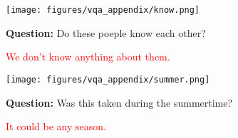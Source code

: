 \begin{figure}[h]
\centering

\begin{tcolorbox}[colback=gray!4, colframe=gray!50, arc=2mm, boxrule=0.5pt,left=9pt,right=9pt]
\small
    
\begin{minipage}{0.48\textwidth}
\begin{tcolorbox}[colback=white, colframe=gray!50, arc=2mm, boxrule=0.5pt]
\begin{minipage}{0.46\textwidth}
\texttt{[image: figures/vqa\_appendix/know.png]}
\end{minipage}
\hfill
\begin{minipage}{0.5\textwidth}
\textbf{Question:} Do these poeple know each other?\\
\end{minipage}
\end{tcolorbox}
\hspace{1.4em}\textcolor{red}{We don't know anything about them.}
\end{minipage}
\hfill
\begin{minipage}{0.48\textwidth}
    \begin{tcolorbox}[colback=white, colframe=gray!50, arc=2mm, boxrule=0.5pt]
\begin{minipage}{0.46\textwidth}
\texttt{[image: figures/vqa\_appendix/summer.png]}
\end{minipage}
\hfill
\begin{minipage}{0.5\textwidth}
\textbf{Question:} Was this taken during the summertime?\\
\end{minipage}
    \end{tcolorbox}
    \hspace{1.4em}\textcolor{red}{It could be any season.}
\end{minipage}
\vspace{1em}


\end{tcolorbox}
\end{figure}
